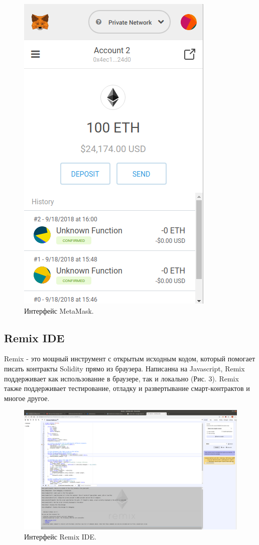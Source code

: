\documentclass{article}
\begin{document}
\begin{figure}
    \centering
    \includegraphics[scale=0.4]{metamask_1}
    \caption{Интерфейс MetaMask.}
    \label{fig:metamask_1}
\end{figure}


\subsection{Remix IDE}

Remix - это мощный инструмент с открытым исходным кодом, который помогает писать контракты Solidity прямо из браузера. Написанна на Javascript, Remix поддерживает как использование в браузере, так и локально (Рис. 3). Remix также поддерживает тестирование, отладку и развертывание смарт-контрактов и многое другое.

\begin{figure}
    \centering
    \includegraphics[scale=0.14]{remix_ide_1}
    \caption{Интерфейс Remix IDE.}
    \label{fig:remix_ide_1}
\end{figure}
\end{document}
